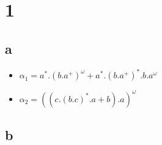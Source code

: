 \documentclass[11pt]{article}
\begin{document}
	
\section{1}
\subsection{a}
\begin{itemize}
	\item $\alpha_1 = a^*.(b.a^+)^\omega + a^*.(b.a^+)^*.b.a^\omega$
	\item $\alpha_2 = ((c.(b.c)^*.a+b).a)^\omega$
\end{itemize}

\subsection{b}
\end{document}

